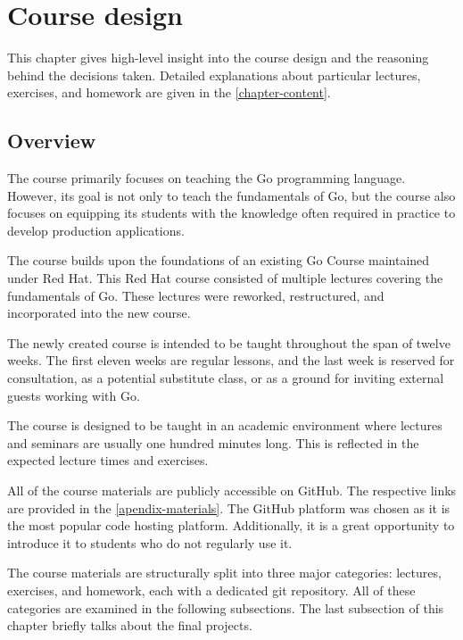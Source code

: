 \documentclass[
  digital,
  color,
  oneside,
  nosansbold,
  nocolorbold,
  nolof,
  nolot,
]{fithesis4}
\begin{document}
\chapter{Course design}\label{chapter-design}

This chapter gives high-level insight into the course design and the reasoning behind the decisions taken. Detailed explanations about particular lectures, exercises, and homework are given in the \cref{chapter-content}.

\section{Overview}\label{design-overview}

The course primarily focuses on teaching the Go programming language. However, its goal is not only to teach the fundamentals of Go, but the course also focuses on equipping its students with the knowledge often required in practice to develop production applications.

The course builds upon the foundations of an existing Go Course maintained under Red Hat\cite{redhat-go-course}. This Red Hat course consisted of multiple lectures covering the fundamentals of Go. These lectures were reworked, restructured, and incorporated into the new course.

The newly created course is intended to be taught throughout the span of twelve weeks. The first eleven weeks are regular lessons, and the last week is reserved for consultation, as a potential substitute class, or as a ground for inviting external guests working with Go.

The course is designed to be taught in an academic environment where lectures and seminars are usually one hundred minutes long. This is reflected in the expected lecture times and exercises.

All of the course materials are publicly accessible on GitHub\cite{github}. The respective links are provided in the \cref{apendix-materials}. The GitHub platform was chosen as it is the most popular code hosting platform\cite{github-wiki}. Additionally, it is a great opportunity to introduce it to students who do not regularly use it.

The course materials are structurally split into three major categories: lectures, exercises, and homework, each with a dedicated git repository. All of these categories are examined in the following subsections. The last subsection of this chapter briefly talks about the final projects.
\end{document}
